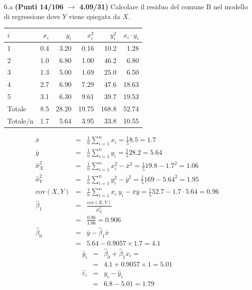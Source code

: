 \documentclass[
  11pt,
]{book}
\theoremstyle{mytheoremstyle}
\theoremstyle{mydefstyle}
\newenvironment{sol}
  {
  \begin{tcolorbox}[enhanced,breakable,arc=0.1mm,boxrule=1pt,colback=white,colframe=iblue,
  title=\bf \fontfamily{lmss}\selectfont \hspace{.5 cm} Soluzione,drop fuzzy shadow]

}{
\end{tcolorbox}
  }
\begin{document}
6.a \textbf{(Punti 14/106 \(\rightarrow\) 4.09/31)} Calcolare il residuo del comune B nel modello di regressione dove \(Y\) viene spiegata da \(X\).

\begin{sol}

\begin{table}[H]
\centering
\begin{tabular}{lrrrrr}
\toprule
$i$ & $x_i$ & $y_i$ & $x_i^2$ & $y_i^2$ & $x_i\cdot y_i$\\
\midrule
1 & 0.4 & 3.20 & 0.16 & 10.2 & 1.28\\
2 & 1.0 & 6.80 & 1.00 & 46.2 & 6.80\\
3 & 1.3 & 5.00 & 1.69 & 25.0 & 6.50\\
4 & 2.7 & 6.90 & 7.29 & 47.6 & 18.63\\
5 & 3.1 & 6.30 & 9.61 & 39.7 & 19.53\\
Totale & 8.5 & 28.20 & 19.75 & 168.8 & 52.74\\
Totale/n & 1.7 & 5.64 & 3.95 & 33.8 & 10.55\\
\bottomrule
\end{tabular}
\end{table}

\begin{eqnarray*}
           \bar x &=&\frac 1 n\sum_{i=1}^n x_i = \frac {1}{ 5 }  8.5 =  1.7 \\
           \bar y &=&\frac 1 n\sum_{i=1}^n y_i = \frac {1}{ 5 }  28.2 =  5.64 \\
           \hat\sigma_X^2&=&\frac 1 n\sum_{i=1}^n x_i^2-\bar x^2=\frac {1}{ 5 }  19.8  - 1.7 ^2= 1.06 \\
           \hat\sigma_Y^2&=&\frac 1 n\sum_{i=1}^n y_i^2-\bar y^2=\frac {1}{ 5 }  169  - 5.64 ^2= 1.95 \\
           \text{cov}(X,Y)&=&\frac 1 n\sum_{i=1}^n x_i~y_i-\bar x\bar y=\frac {1}{ 5 }  52.7 - 1.7 \cdot 5.64 = 0.96 \\
           \hat\beta_1 &=& \frac{\text{cov}(X,Y)}{\hat\sigma_X^2} \\
                    &=& \frac{ 0.96 }{ 1.06 }  =  0.906 \\
           \hat\beta_0 &=& \bar y - \hat\beta_1 \bar x\\
                    &=&  5.64 - 0.9057 \times  1.7 = 4.1 
         \end{eqnarray*}\begin{eqnarray*}
\hat y_i &=&\hat\beta_0+\hat\beta_1 x_i=\\ 
&=& 4.1 + 0.9057 \times 1 = 5.01 \\ 
\hat \varepsilon_i &=& y_i-\hat y_i\\ 
&=& 6.8 - 5.01 = 1.79  
\end{eqnarray*}

\end{sol}
\end{document}
